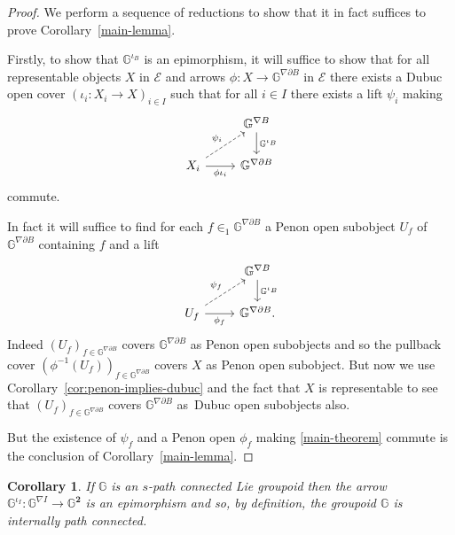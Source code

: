 \documentclass[pdftex]{sigma}
\numberwithin{equation}{section}
\newtheorem{Corollary}[Theorem]{Corollary}
\begin{document}
\begin{proof}We perform a sequence of reductions to show that it in fact suf\/f\/ices to prove Corollary~\ref{main-lemma}.

Firstly, to show that $\mathbb{G}^{\iota_B}$ is an epimorphism, it will suf\/f\/ice to show that for all representable objects $X$ in $\mathcal{E}$ and arrows $\phi\colon X \rightarrow \mathbb{G}^{\nabla\partial B}$ in $\mathcal{E}$ there exists a Dubuc open cover $(\iota_i\colon X_i \rightarrow X)_{i\in I}$ such that for all $i\in I$ there exists a lift $\psi_i$ making
\begin{equation*}
\begin{tikzcd}
 {} & \mathbb{G}^{\nabla B} \dar{\mathbb{G}^{\iota_B}}\\
 X_i \rar[swap]{\phi\iota_i} \urar[dashed]{\psi_i} & \mathbb{G}^{\nabla\partial B}
\end{tikzcd}
\end{equation*}
commute.

In fact it will suf\/f\/ice to f\/ind for each $f\in_1 \mathbb{G}^{\nabla\partial B}$ a Penon open subobject $U_f$ of $\mathbb{G}^{\nabla\partial B}$ containing $f$ and a lift
\begin{equation}\label{main-theorem}
\begin{tikzcd}
 {} & \mathbb{G}^{\nabla B} \dar{\mathbb{G}^{\iota_B}}\\
 U_f \rar[swap]{\phi_f} \urar[dashed]{\psi_f} & \mathbb{G}^{\nabla\partial B}.
\end{tikzcd}
\end{equation}
Indeed $(U_f)_{f\in \mathbb{G}^{\nabla\partial B}}$ covers $\mathbb{G}^{\nabla\partial B}$ as Penon open subobjects and so the pullback cover \linebreak $(\phi^{-1}(U_f))_{f\in\mathbb{G}^{\nabla\partial B}}$ covers $X$ as Penon open subobject. But now we use Corollary~\ref{cor:penon-implies-dubuc} and the fact that $X$ is representable to see that $(U_f)_{f\in \mathbb{G}^{\nabla\partial B}}$ covers $\mathbb{G}^{\nabla\partial B}$ as~Dubuc open subobjects also.

But the existence of $\psi_f$ and a Penon open $\phi_f$ making \eqref{main-theorem} commute is the conclusion of Corollary~\ref{main-lemma}.
\end{proof}

\begin{Corollary}If $\mathbb{G}$ is an $s$-path connected Lie groupoid then the arrow $\mathbb{G}^{\iota_I}\colon \mathbb{G}^{\nabla I}\rightarrow \mathbb{G}^{\mathbf{2}}$ is an epimorphism and so, by definition, the groupoid $\mathbb{G}$ is internally path connected.
\end{Corollary}
\end{document}
